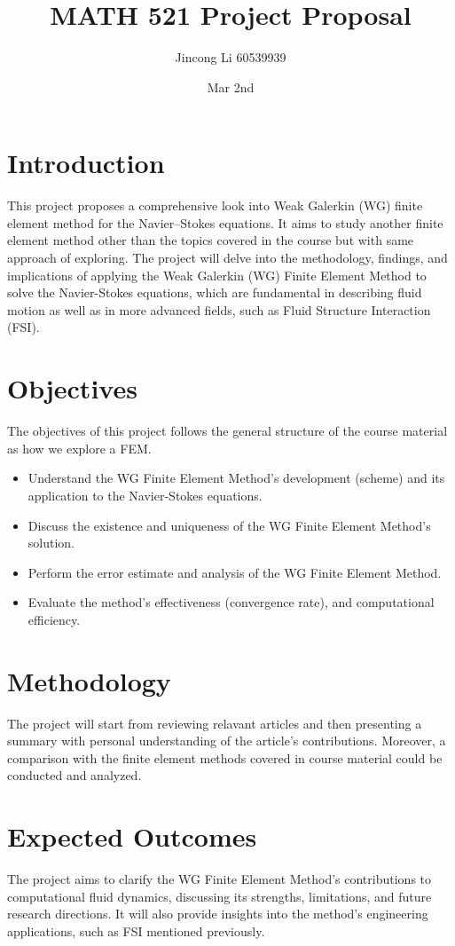 \documentclass[a4paper,11pt]{article} %
\begin{document}
\setlength{\parskip}{1em} 
\setlength{\parindent}{0pt}
\newcommand{\vect}[1]{\mathbf{#1}}

\title{MATH 521 Project Proposal}
\author{Jincong Li 60539939}
\date{Mar 2nd}
\maketitle

\section{Introduction}
This project proposes a comprehensive look into Weak Galerkin (WG) finite element 
method for the Navier–Stokes equations. It aims to study another finite element method other than the topics covered in the course but with 
same approach of exploring. The project will delve into the methodology, findings, 
and implications of applying the Weak Galerkin (WG) Finite Element Method to solve 
the Navier-Stokes equations, which are fundamental in describing fluid motion as well as in 
more advanced fields, such as Fluid Structure Interaction (FSI).

\section{Objectives}
The objectives of this project follows the general structure of the course material as how we explore a FEM.
\begin{itemize}
    \item Understand the WG Finite Element Method's development (scheme) and its application to the Navier-Stokes equations.
    \item Discuss the existence and uniqueness of the WG Finite Element Method's solution.
    \item Perform the error estimate and analysis of the WG Finite Element Method.
    \item Evaluate the method's effectiveness (convergence rate), and computational efficiency.
\end{itemize}

\section{Methodology}
The project will start from reviewing relavant articles and then presenting a summary with personal understanding of the article's contributions. 
Moreover, a comparison with the finite element methods covered in course material could be conducted and analyzed.

\section{Expected Outcomes}
The project aims to clarify the WG Finite Element Method's contributions to computational 
fluid dynamics, discussing its strengths, limitations, and future research directions. 
It will also provide insights into the method's engineering applications, such as FSI mentioned previously.
\end{document}
